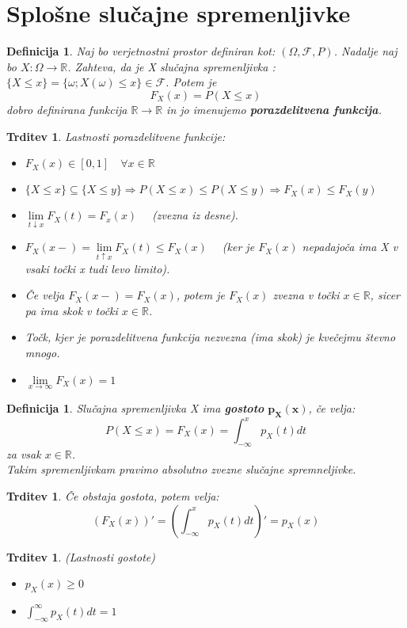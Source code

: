 \documentclass[11pt]{article}
\newtheorem{Trditev}[Izrek]{{\sc Trditev}}
\newtheorem{Definicija}[Izrek]{{\sc Definicija}}
\begin{document}
\section{Splošne slučajne spremenljivke}
\begin{Definicija}
	Naj bo verjetnostni prostor definiran kot: $(\Omega, \mathcal{F},P)$. Nadalje naj bo $X: \Omega \to \mathbb{R}$. Zahteva, da je X slučajna spremenljivka : $\{ X\le x\} = \{\omega ; X(\omega) \le x\} \in \mathcal{F}$. Potem je $$F_X(x)  = P(X \le x)$$ dobro definirana funkcija $\mathbb{R}\to \mathbb{R}$ in jo imenujemo \textbf{porazdelitvena funkcija}.
\end{Definicija}
\begin{Trditev}
	Lastnosti porazdelitvene funkcije:
	\begin{itemize}
		\item
		$F_X(x) \in [0,1] \quad \forall x\in \mathbb{R}$
		\item
		$\{X \le x\} \subseteq \{X \le y \} \Rightarrow P(X \le x) \le P(X \le y) \Rightarrow F_X(x) \le F_X(y) $
		\item
		$\lim\limits_{t \downarrow x}{F_X(t)} = F_x(x) \quad$ (zvezna iz desne).
		\item
		$F_X(x-) = \lim\limits_{t\uparrow x}F_X(t) \le F_X(x) \quad$
		(ker je $F_X(x)$ nepadajoča ima X v vsaki točki x tudi levo limito).
		
		\item
		Če velja $F_X(x -) = F_X(x)$, potem je $F_X(x)$ zvezna v točki $x\in\mathbb{R}$, sicer pa ima skok v točki $x\in \mathbb{R}$.
		\item
		Točk, kjer je porazdelitvena funkcija nezvezna (ima skok) je kvečejmu števno mnogo.
		\item
		$\lim\limits_{x \to \infty}{F_X(x)} = 1$
	\end{itemize}
\end{Trditev}
\begin{Definicija}
	Slučajna spremenljivka X ima\textbf{ gostoto} $\mathbf{p_X(x)}$, če velja:
	$$P(X\le x) = F_X(x) = \int_{-\infty}^{x}{p_X(t)dt}$$ za vsak $x\in \mathbb{R}$.
	\\
	Takim spremenljivkam pravimo absolutno zvezne slučajne spremneljivke. 
\end{Definicija}
\begin{Trditev}
	Če obstaja gostota, potem velja:
	$$\left( F_X(x) \right)' = \left(\int_{-\infty}^{x}{p_X(t)dt}\right)'= p_X(x)$$
\end{Trditev}
\begin{Trditev}(Lastnosti gostote)
\begin{itemize}
	\item
	$p_X(x) \ge 0$
	\item	
	$\int_{-\infty}^{\infty}{p_X(t) dt} = 1 $
\end{itemize}
\end{Trditev}
\end{document}
